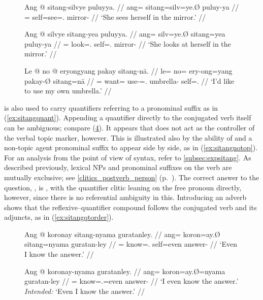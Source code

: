 \begin{figure}
\ex\label{ex:reflvb}\begingl
	\gla Ang @ sitang-silvye puluyya. //
	\glb ang= sitang=silv=ye.Ø puluy-ya //
	\glc \AgtT{}= self=see=\TsgF{}.\Top{} mirror-\Loc{} //
	\glft `She sees herself in the mirror.' //
\endgl\xe
\end{figure}

\begin{figure}
\ex\label{ex:reflloc}\begingl
	\gla Ang @ silvye sitang-yea puluyya. //
	\glb ang= silv=ye.Ø sitang=yea puluy-ya //
	\glc \AgtT{}= look=\TsgF{}.\Top{} self=\TsgF{}.\Loc{} mirror-\Loc{} //
	\glft `She looks at herself in the mirror.' //
\endgl\xe
\end{figure}

\begin{figure}
\ex\label{ex:emphposs}%
\begingl
	\gla Le @ no @ eryongyang pakay sitang-nā. //
	\glb le= no= ery-ong=yang pakay-Ø sitang=nā //
	\glc \PatTI{}= want= use-\Irr{}=\Fsg{}.\Aarg{} umbrella-\Top{} 
		self=\Fsg{}.\Gen{} //
	\glft `I'd like to use my own umbrella.' //
\endgl\xe
\end{figure}

 is also used to carry quantifiers referring to a
pronominal suffix as in (\ref{ex:sitangquant}). Appending a quantifier directly
to the conjugated verb itself can be ambiguous; compare
(\ref{ex:nositangquant}). It appears that  does not act as
the controller of the verbal topic marker, however. This is illustrated also by
the ability of  and a non-topic agent pronominal suffix to
appear side by side, as in (\ref{ex:sitangnotop}). For an analysis from the
point of view of syntax, refer to \autoref{subsec:expsitang}. As described
previously, lexical NPs and pronominal suffixes on the verb are mutually
exclusive; see \autoref{clitics_postverb_person}
(p.~\pageref{clitics_postverb_person}). The correct answer to the question,
, is , with the quantifier clitic
leaning on the free pronoun directly, however, since there is no referential
ambiguity in this. Introducing an adverb shows that the reflexive--quantifier
compound follows the conjugated verb and its adjuncts, as in
(\ref{ex:sitangqtorder}).

\begin{figure}
\pex
\a\label{ex:sitangquant}\begingl
	\gla Ang @ koronay sitang-nyama guratanley. //
	\glb ang= koron=ay.Ø sitang=nyama guratan-ley //
	\glc \AgtT{}= know=\Fsg{}.\Top{} self=even answer-\PargI{} //
	\glft `Even I know the answer.' //
\endgl

\a\label{ex:nositangquant}\ljudge\excl\begingl
	\gla Ang @ koronay-nyama guratanley. //
	\glb ang= koron=ay.Ø=nyama guratan-ley //
	\glc \AgtT{}= know=\Fsg{}.\Top{}=even answer-\PargI{} //
	\glft `I even know the answer.' \\
		\textit{Intended:} `Even I know the answer.' //
\endgl
\xe
\end{figure}

